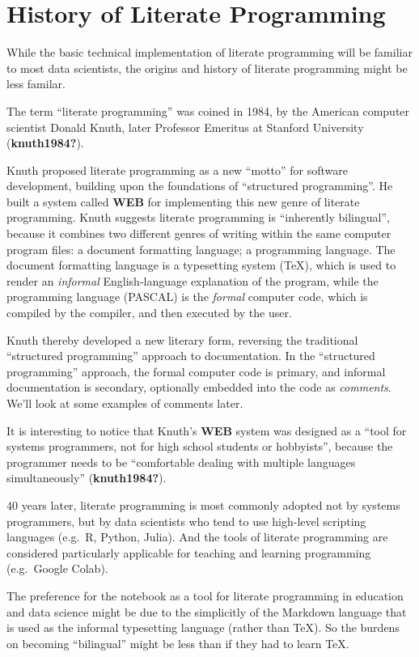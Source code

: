 \documentclass[
  letterpaper,
  DIV=11,
  numbers=noendperiod]{scrartcl}
\begin{document}
\section{History of Literate
Programming}\label{history-of-literate-programming}

While the basic technical implementation of literate programming will be
familiar to most data scientists, the origins and history of literate
programming might be less familar.

The term ``literate programming'' was coined in 1984, by the American
computer scientist Donald Knuth, later Professor Emeritus at Stanford
University (\textbf{knuth1984?}).

Knuth proposed literate programming as a new ``motto'' for software
development, building upon the foundations of ``structured
programming''. He built a system called \textbf{WEB} for implementing
this new genre of literate programming. Knuth suggests literate
programming is ``inherently bilingual'', because it combines two
different genres of writing within the same computer program files: a
document formatting language; a programming language. The document
formatting language is a typesetting system (TeX), which is used to
render an \emph{informal} English-language explanation of the program,
while the programming language (PASCAL) is the \emph{formal} computer
code, which is compiled by the compiler, and then executed by the user.

Knuth thereby developed a new literary form, reversing the traditional
``structured programming'' approach to documentation. In the
``structured programming'' approach, the formal computer code is
primary, and informal documentation is secondary, optionally embedded
into the code as \emph{comments}. We'll look at some examples of
comments later.

It is interesting to notice that Knuth's \textbf{WEB} system was
designed as a ``tool for systems programmers, not for high school
students or hobbyists'', because the programmer needs to be
``comfortable dealing with multiple languages simultaneously''
(\textbf{knuth1984?}).

40 years later, literate programming is most commonly adopted not by
systems programmers, but by data scientists who tend to use high-level
scripting languages (e.g.~R, Python, Julia). And the tools of literate
programming are considered particularly applicable for teaching and
learning programming (e.g.~Google Colab).

The preference for the notebook as a tool for literate programming in
education and data science might be due to the simplicitly of the
Markdown language that is used as the informal typesetting language
(rather than TeX). So the burdens on becoming ``bilingual'' might be
less than if they had to learn TeX.
\end{document}
